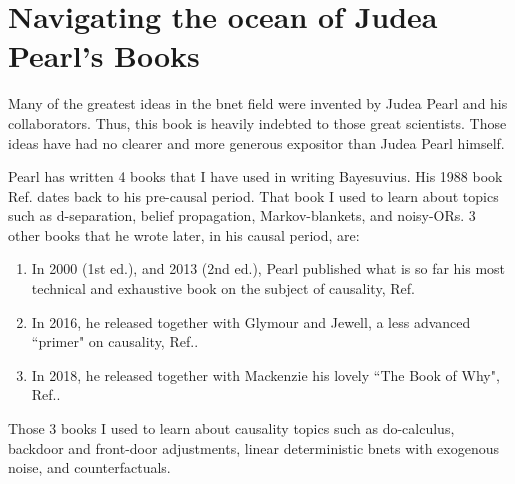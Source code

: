 \section{Navigating 
the ocean of Judea Pearl's Books}
\label{ch-nav-pearl}
Many
of the
greatest ideas 
in the bnet field 
were invented by Judea Pearl
and his collaborators.
Thus, this book is 
heavily indebted to
those great scientists.
Those ideas have had no clearer
and more generous 
expositor than Judea Pearl
himself.

Pearl has written
4 books that I have used
in writing Bayesuvius.
His 
1988 book Ref.\cite{pearl-1988book}
dates back to his pre-causal period.
That book I used to learn
about topics such as
d-separation, belief propagation,
Markov-blankets, and noisy-ORs.
3 other books that  he  wrote later,
in his causal period, 
are:
\begin{enumerate}
\item
In 2000 (1st ed.), and 2013 (2nd ed.),
Pearl published what
is so far
his most technical
and exhaustive book
on the subject of causality,
Ref\cite{pearl-2013book}.
\item
In 2016,
he released 
together
with Glymour and Jewell,
a less advanced ``primer"
on causality, Ref.\cite{pearl-primer}.
\item
In 2018, 
he released 
together with
Mackenzie his
lovely  ``The Book of Why",
 Ref.\cite{book-why}.
\end{enumerate}
Those 3 books I used to learn
about causality topics
such as do-calculus,
backdoor and front-door
adjustments, 
linear 
deterministic 
bnets with exogenous noise,
and counterfactuals.